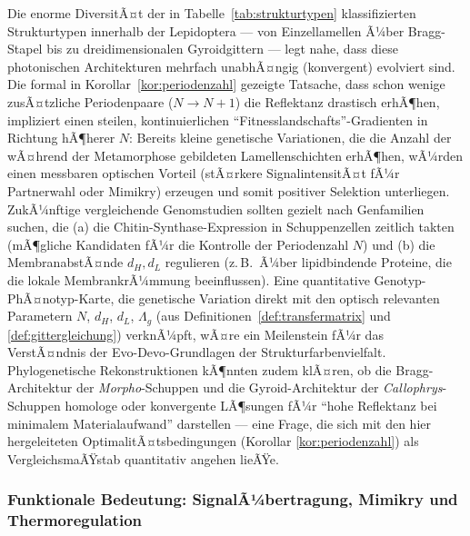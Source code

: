﻿\documentclass[a4paper,12pt]{article}
\theoremstyle{definition}
\begin{document}
	Die enorme DiversitÃ¤t der in Tabelle~\ref{tab:strukturtypen}
	klassifizierten Strukturtypen innerhalb der Lepidoptera --- von
	Einzellamellen Ã¼ber Bragg-Stapel bis zu dreidimensionalen
	Gyroidgittern --- legt nahe, dass diese photonischen Architekturen
	mehrfach unabhÃ¤ngig (konvergent) evolviert sind. Die formal in
	Korollar~\ref{kor:periodenzahl} gezeigte Tatsache, dass schon wenige
	zusÃ¤tzliche Periodenpaare ($N\to N+1$) die Reflektanz drastisch
	erhÃ¶hen, impliziert einen steilen, kontinuierlichen
	``Fitnesslandschafts''-Gradienten in Richtung hÃ¶herer $N$: Bereits
	kleine genetische Variationen, die die Anzahl der wÃ¤hrend der
	Metamorphose gebildeten Lamellenschichten erhÃ¶hen, wÃ¼rden einen
	messbaren optischen Vorteil (stÃ¤rkere SignalintensitÃ¤t fÃ¼r
	Partnerwahl oder Mimikry) erzeugen und somit positiver Selektion
	unterliegen. ZukÃ¼nftige vergleichende Genomstudien sollten gezielt
	nach Genfamilien suchen, die (a) die Chitin-Synthase-Expression in
	Schuppenzellen zeitlich takten (mÃ¶gliche Kandidaten fÃ¼r die
	Kontrolle der Periodenzahl $N$) und (b) die MembranabstÃ¤nde
	$d_H,d_L$ regulieren (z.\,B.\ Ã¼ber lipidbindende Proteine, die die
	lokale MembrankrÃ¼mmung beeinflussen). Eine quantitative
	Genotyp-PhÃ¤notyp-Karte, die genetische Variation direkt mit den
	optisch relevanten Parametern $N$, $d_H$, $d_L$, $\Lambda_g$
	(aus Definitionen~\ref{def:transfermatrix} und
	\ref{def:gittergleichung}) verknÃ¼pft, wÃ¤re ein Meilenstein fÃ¼r das
	VerstÃ¤ndnis der Evo-Devo-Grundlagen der Strukturfarbenvielfalt.
	Phylogenetische Rekonstruktionen kÃ¶nnten zudem klÃ¤ren, ob die
	Bragg-Architektur der \textit{Morpho}-Schuppen und die
	Gyroid-Architektur der \textit{Callophrys}-Schuppen homologe oder
	konvergente LÃ¶sungen fÃ¼r ``hohe Reflektanz bei minimalem
	Materialaufwand'' darstellen --- eine Frage, die sich mit den hier
	hergeleiteten OptimalitÃ¤tsbedingungen (Korollar
	\ref{kor:periodenzahl}) als VergleichsmaÃŸstab quantitativ angehen
	lieÃŸe.

	\subsubsection{Funktionale Bedeutung: SignalÃ¼bertragung, Mimikry und Thermoregulation}
\end{document}

